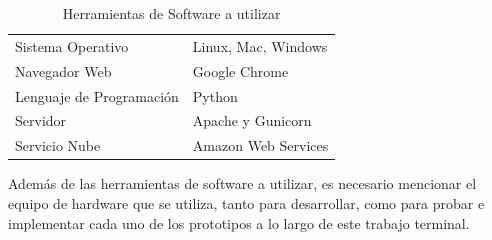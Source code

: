 \documentclass[12pt, a4paper, titlepage]{report}
\begin{document}
    	\begin{table}[H]
    		\begin{tabular}{ |p{3.5cm}|p{9.5cm}|}
    			\hline
    			\rowcolor{guindapoli}
    			\multicolumn{2}{|c|}{\textbf{\textcolor{white}{Herramientas de Software a utilizar}}}\\
    			\hline
    			\cellcolor{azulclaro}Sistema Operativo & 
    			Linux, Mac, Windows \\ 
    			\hline
    			\cellcolor{azulclaro}Navegador Web &
    			Google Chrome\\
    			\hline
    			\cellcolor{azulclaro}Lenguaje de Programaci\'on &
    			Python\\
    			\hline
    			\cellcolor{azulclaro}Servidor &
    			Apache y Gunicorn\\
    			\hline
    			\cellcolor{azulclaro}Servicio Nube &
    			Amazon Web Services\\
    			\hline    			
    		\end{tabular}
    		\caption[Herramientas de Software]{Herramientas de Software a utilizar}
    	\end{table}
    
    	Además de las herramientas de software a utilizar, es necesario mencionar el equipo de hardware que se utiliza, tanto para desarrollar, como para probar e implementar cada uno de los prototipos a lo largo de este trabajo terminal.
    	
\end{document}
